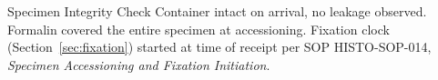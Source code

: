 \vspace{6pt}
\begin{infobox}{Specimen Integrity Check}
Container intact on arrival, no leakage observed. Formalin covered the entire specimen
at accessioning. Fixation clock (Section~\ref{sec:fixation}) started at time of receipt
per SOP HISTO-SOP-014, \emph{Specimen Accessioning and Fixation Initiation}.
\end{infobox}
